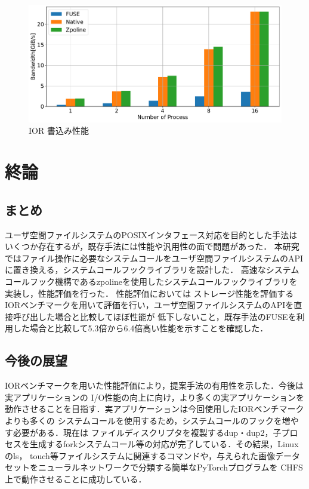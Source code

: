 \documentclass[a4paper，11pt]{jreport}
\begin{document}
\begin{figure}[h]
    \begin{minipage}[b]{1\columnwidth}
		\centering
		\includegraphics[width=0.9\linewidth]{./figure/ior_benchmark_write.pdf}
		\caption{IOR 書込み性能}
		\label{fig:Evaluation write}
	\end{minipage}
\end{figure}

\chapter{終論}
\section{まとめ}
ユーザ空間ファイルシステムのPOSIXインタフェース対応を目的とした手法はいくつか存在するが，既存手法には性能や汎用性の面で問題があった．
本研究ではファイル操作に必要なシステムコールをユーザ空間ファイルシステムのAPIに置き換える，システムコールフックライブラリを設計した．
高速なシステムコールフック機構であるzpolineを使用したシステムコールフックライブラリを実装し，性能評価を行った．
性能評価においては
ストレージ性能を評価するIORベンチマークを用いて評価を行い，ユーザ空間ファイルシステムのAPIを直接呼び出した場合と比較してほぼ性能が
低下しないこと，既存手法のFUSEを利用した場合と比較して5.3倍から6.4倍高い性能を示すことを確認した．

\section{今後の展望}
IORベンチマークを用いた性能評価により，提案手法の有用性を示した．今後は実アプリケーションの
I/O性能の向上に向け，より多くの実アプリケーションを動作させることを目指す．実アプリケーションは今回使用したIORベンチマークよりも多くの
システムコールを使用するため，システムコールのフックを増やす必要がある．現在は
ファイルディスクリプタを複製するdup・dup2，子プロセスを生成するforkシステムコール等の対応が完了している．その結果，Linuxのls，
touch等ファイルシステムに関連するコマンドや，与えられた画像データセットをニューラルネットワークで分類する簡単なPyTorchプログラムを
CHFS上で動作させることに成功している．
\end{document}
